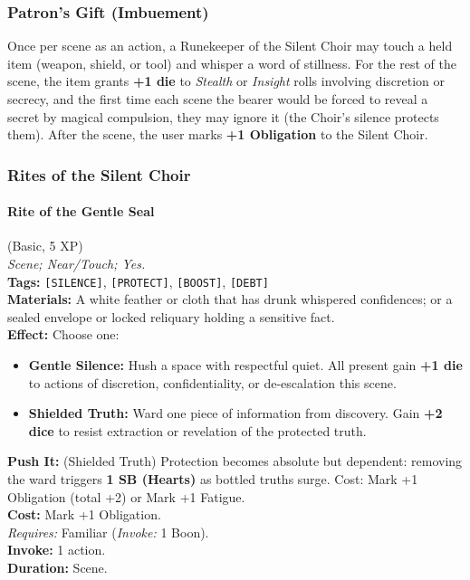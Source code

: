 \subsubsection*{Patron's Gift (Imbuement)}

Once per scene as an action, a Runekeeper of the Silent Choir may touch a held item (weapon, shield, or tool) and whisper a word of stillness. For the rest of the scene, the item grants \textbf{+1 die} to \textit{Stealth} or \textit{Insight} rolls involving discretion or secrecy, and the first time each scene the bearer would be forced to reveal a secret by magical compulsion, they may ignore it (the Choir's silence protects them). After the scene, the user marks \textbf{+1 Obligation} to the Silent Choir.

\subsubsection*{Rites of the Silent Choir}

\paragraph{Rite of the Gentle Seal} (Basic, 5 XP) \hfill \\
\emph{Scene; Near/Touch; Yes.} \\
\textbf{Tags:} \texttt{[SILENCE]}, \texttt{[PROTECT]}, \texttt{[BOOST]}, \texttt{[DEBT]} \\
\textbf{Materials:} A white feather or cloth that has drunk whispered confidences; or a sealed envelope or locked reliquary holding a sensitive fact. \\
\textbf{Effect:} Choose one:
\begin{itemize}
  \item \textbf{Gentle Silence:} Hush a space with respectful quiet. All present gain \textbf{+1 die} to actions of discretion, confidentiality, or de-escalation this scene.
  \item \textbf{Shielded Truth:} Ward one piece of information from discovery. Gain \textbf{+2 dice} to resist extraction or revelation of the protected truth.
\end{itemize}
\textbf{Push It:} (Shielded Truth) Protection becomes absolute but dependent: removing the ward triggers \textbf{1 SB (Hearts)} as bottled truths surge. Cost: Mark +1 Obligation (total +2) or Mark +1 Fatigue. \\
\textbf{Cost:} Mark +1 Obligation. \\
\textit{Requires:} Familiar (\textit{Invoke:} 1 Boon). \\
\textbf{Invoke:} 1 action. \\
\textbf{Duration:} Scene.

